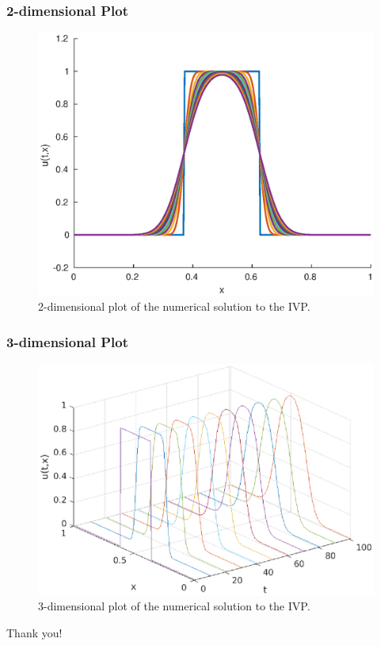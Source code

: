 \documentclass{beamer}
\begin{document}
\begin{frame}
	\frametitle{2-dimensional Plot}
	\begin{figure}[ht]
		\centering
		\includegraphics[scale=0.65]{../write-up/heat_eq_2d}
		\caption{2-dimensional plot of the numerical solution to the IVP.}
	\end{figure}
\end{frame}
\begin{frame}
	\frametitle{3-dimensional Plot}
	\begin{figure}[ht]
		\centering
		\includegraphics[scale=0.65]{../write-up/heat_eq_3d}
		\caption{3-dimensional plot of the numerical solution to the IVP.}
	\end{figure}
\end{frame}

\begin{frame}
	\begin{center}
		Thank you!
	\end{center}
\end{frame}
\end{document}
